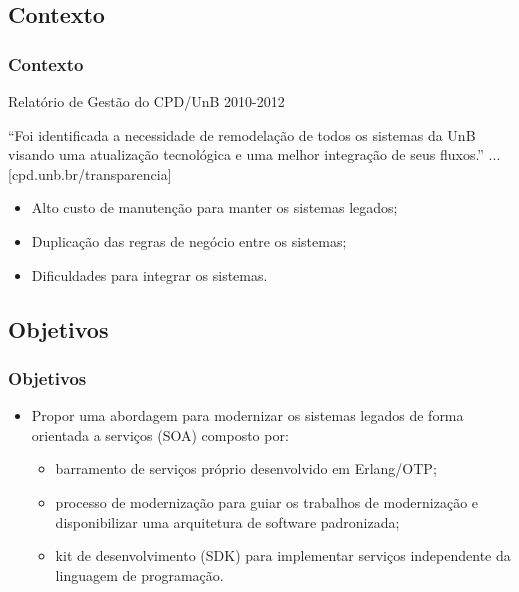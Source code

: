 \documentclass{beamer}
\begin{document}




\subsection{Contexto}


\begin{frame}
  \frametitle{Contexto}

  \begin{exampleblock}{Relatório de Gestão do CPD/UnB 2010-2012}
  
		“Foi identificada a necessidade de remodelação de todos os sistemas
da UnB visando uma atualização tecnológica e uma melhor
integração de seus fluxos.” ... [cpd.unb.br/transparencia]

    \begin{itemize}
  	  \item<1-> Alto custo de manutenção para manter os sistemas legados;
   	  \item<1-> Duplicação das regras de negócio entre os sistemas;
  	  \item<1-> Dificuldades para integrar os sistemas.
    \end{itemize}


  \end{exampleblock}

  
\end{frame}














\subsection{Objetivos}


\begin{frame}
  \frametitle{Objetivos}
  
    \begin{itemize}
       \item<1-> Propor uma abordagem para modernizar os sistemas legados de
forma orientada a serviços (SOA) composto por:

    \begin{itemize}
       \item<1->barramento de serviços próprio desenvolvido em Erlang/OTP;
       \item<1->processo de modernização para guiar os trabalhos de modernização 
       e disponibilizar uma arquitetura de software padronizada;
       \item<1->kit de desenvolvimento (SDK) para implementar serviços independente da
       linguagem de programação.
    \end{itemize}
				
    \end{itemize}
    
\end{frame}
\end{document}
